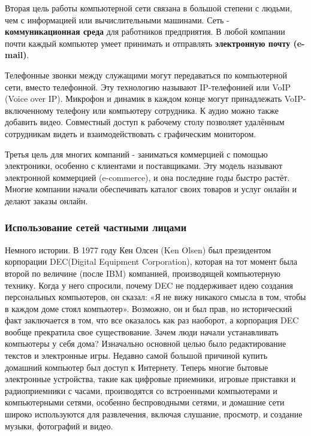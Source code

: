 	\par Вторая цель работы компьютерной сети связана в большой степени с людьми, чем с информацией или вычислительными машинами. Сеть - \textbf{коммуникационная среда} для работников предприятия. В любой компании почти каждый компьютер умеет принимать и отправлять \textbf{электронную почту (e-mail)}. 
	
	\par Телефонные звонки между служащими могут передаваться по компьютерной сети, вместо телефонной. Эту технологию называют IP-телефонией или VoIP (Voice over IP). Микрофон и динамик в каждом конце могут принадлежать VoIP-включенному телефону или компьютеру сотрудника.  К аудио можно также добавить видео. Совместный доступ к рабочему столу позволяет удалённым сотрудникам видеть и взаимодействовать с графическим монитором. 
	
	\par Третья цель для многих компаний - заниматься коммерцией с помощью электроники, особенно с клиентами и поставщиками. Эту модель называют электронной коммерцией (e-commerce), и она последние годы быстро растёт. Многие компании начали обеспечивать каталог своих товаров и услуг онлайн и делают заказы онлайн. 
	
	\subsubsection{Использование сетей частными лицами}
	
	Немного истории. В 1977 году Кен Олсен (Ken Olsen) был президентом корпорации DEC(Digital Equipment Corporation),  которая на тот момент была второй по величине (после IBM) компанией, производящей компьютерную технику. Когда у него спросили, почему DEC не поддерживает идею создания персональных компьютеров, он сказал: «Я не вижу никакого смысла в том, чтобы в каждом доме стоял компьютер». Возможно, он и был прав, но исторический факт заключается в том, что все оказалось как раз наоборот, а корпорация DEC вообще прекратила свое существование. Зачем люди начали устанавливать компьютеры у себя дома? Изначально основной целью было редактирование текстов и электронные игры. Недавно самой большой причиной купить домашний компьютер был доступ к Интернету. Теперь многие бытовые электронные устройства, такие как цифровые приемники, игровые приставки и радиоприемники с часами, производятся со встроенными компьютерами и компьютерными сетями, особенно беспроводными сетями, и домашние сети широко используются для развлечения, включая слушание, просмотр, и создание музыки, фотографий и видео. 
	
